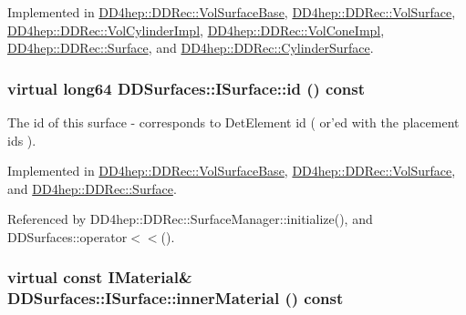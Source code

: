 Implemented in \hyperlink{class_d_d4hep_1_1_d_d_rec_1_1_vol_surface_base_aa5a6ee5edfdab58a13282beaef1331d4}{DD4hep::DDRec::VolSurfaceBase}, \hyperlink{class_d_d4hep_1_1_d_d_rec_1_1_vol_surface_aa4251b5a2eb3f18a84e7b369929b6ba3}{DD4hep::DDRec::VolSurface}, \hyperlink{class_d_d4hep_1_1_d_d_rec_1_1_vol_cylinder_impl_a66cd91cef2963fa1d1495d4764e2d94f}{DD4hep::DDRec::VolCylinderImpl}, \hyperlink{class_d_d4hep_1_1_d_d_rec_1_1_vol_cone_impl_a427ac9a8bccf658a2161b21d6ae1267f}{DD4hep::DDRec::VolConeImpl}, \hyperlink{class_d_d4hep_1_1_d_d_rec_1_1_surface_a3c42b99943d5670d31ee67a90bdbafbd}{DD4hep::DDRec::Surface}, and \hyperlink{class_d_d4hep_1_1_d_d_rec_1_1_cylinder_surface_ad5772b2599d37ee4280dc074873aef40}{DD4hep::DDRec::CylinderSurface}.\hypertarget{class_d_d_surfaces_1_1_i_surface_aaf7bf967d4a0652c620ec9754a2b37c1}{
\subsubsection[{id}]{\setlength{\rightskip}{0pt plus 5cm}virtual {\bf long64} DDSurfaces::ISurface::id () const}}
\label{class_d_d_surfaces_1_1_i_surface_aaf7bf967d4a0652c620ec9754a2b37c1}


The id of this surface -\/ corresponds to DetElement id ( or'ed with the placement ids ). 

Implemented in \hyperlink{class_d_d4hep_1_1_d_d_rec_1_1_vol_surface_base_ab6e54400eb78cdb78e8f4c53063f863b}{DD4hep::DDRec::VolSurfaceBase}, \hyperlink{class_d_d4hep_1_1_d_d_rec_1_1_vol_surface_a2f65703996e3212715d994f03afa2242}{DD4hep::DDRec::VolSurface}, and \hyperlink{class_d_d4hep_1_1_d_d_rec_1_1_surface_a563f289fbf049099a6bd37433d853a53}{DD4hep::DDRec::Surface}.

Referenced by DD4hep::DDRec::SurfaceManager::initialize(), and DDSurfaces::operator$<$$<$().\hypertarget{class_d_d_surfaces_1_1_i_surface_a18942d2f0ea7478506765a50fa44d5e3}{
\subsubsection[{innerMaterial}]{\setlength{\rightskip}{0pt plus 5cm}virtual const {\bf IMaterial}\& DDSurfaces::ISurface::innerMaterial () const}}
\label{class_d_d_surfaces_1_1_i_surface_a18942d2f0ea7478506765a50fa44d5e3}


